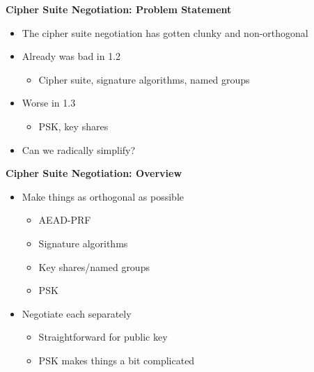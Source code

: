 \documentclass[helvetica]{seminar}
\newcommand{\heading}[1]{%
  \begin{center} 
    \large\bf 
    #1 
  \end{center} 
  \vspace{.4 in}}
\begin{document}
\begin{slide}
\heading{Cipher Suite Negotiation: Problem Statement}

\begin{itemize}
\item The cipher suite negotiation has gotten clunky and non-orthogonal
\item Already was bad in 1.2
  \begin{itemize}
  \item Cipher suite, signature algorithms, named groups
  \end{itemize}
\item Worse in 1.3 
  \begin{itemize}
  \item PSK, key shares
  \end{itemize}
\item Can we radically simplify?
\end{itemize}
\end{slide}

\begin{slide}
\heading{Cipher Suite Negotiation: Overview}

\begin{itemize}
\item Make things as orthogonal as possible
  \begin{itemize}
  \item AEAD-PRF
  \item Signature algorithms
  \item Key shares/named groups
  \item PSK
  \end{itemize}

\item Negotiate each separately
  \begin{itemize}
  \item Straightforward for public key
  \item PSK makes things a bit complicated
  \end{itemize}
\end{itemize}
\end{slide}
\end{document}
